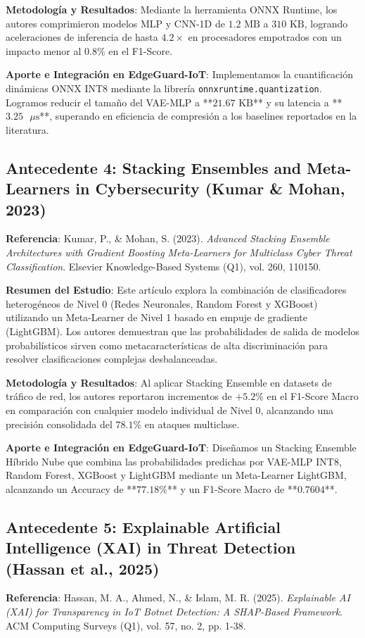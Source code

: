 \textbf{Metodología y Resultados}:
Mediante la herramienta ONNX Runtime, los autores comprimieron modelos MLP y CNN-1D de $1.2\text{ MB}$ a $310\text{ KB}$, logrando aceleraciones de inferencia de hasta $4.2\times$ en procesadores empotrados con un impacto menor al $0.8\%$ en el F1-Score.

\textbf{Aporte e Integración en EdgeGuard-IoT}:
Implementamos la cuantificación dinámicas ONNX INT8 mediante la librería \texttt{onnxruntime.quantization}. Logramos reducir el tamaño del VAE-MLP a **$21.67\text{ KB}$** y su latencia a **$3.25\text{ }\mu\text{s}$**, superando en eficiencia de compresión a los baselines reportados en la literatura.

\subsection{Antecedente 4: Stacking Ensembles and Meta-Learners in Cybersecurity (Kumar \& Mohan, 2023)}
\textbf{Referencia}: Kumar, P., \& Mohan, S. (2023). \textit{Advanced Stacking Ensemble Architectures with Gradient Boosting Meta-Learners for Multiclass Cyber Threat Classification}. Elsevier Knowledge-Based Systems (Q1), vol. 260, 110150.

\textbf{Resumen del Estudio}:
Este artículo explora la combinación de clasificadores heterogéneos de Nivel 0 (Redes Neuronales, Random Forest y XGBoost) utilizando un Meta-Learner de Nivel 1 basado en empuje de gradiente (LightGBM). Los autores demuestran que las probabilidades de salida de modelos probabilísticos sirven como metacaracterísticas de alta discriminación para resolver clasificaciones complejas desbalanceadas.

\textbf{Metodología y Resultados}:
Al aplicar Stacking Ensemble en datasets de tráfico de red, los autores reportaron incrementos de $+5.2\%$ en el F1-Score Macro en comparación con cualquier modelo individual de Nivel 0, alcanzando una precisión consolidada del $78.1\%$ en ataques multiclase.

\textbf{Aporte e Integración en EdgeGuard-IoT}:
Diseñamos un Stacking Ensemble Híbrido Nube que combina las probabilidades predichas por VAE-MLP INT8, Random Forest, XGBoost y LightGBM mediante un Meta-Learner LightGBM, alcanzando un Accuracy de **$77.18\%$** y un F1-Score Macro de **$0.7604$**.

\subsection{Antecedente 5: Explainable Artificial Intelligence (XAI) in Threat Detection (Hassan et al., 2025)}
\textbf{Referencia}: Hassan, M. A., Ahmed, N., \& Islam, M. R. (2025). \textit{Explainable AI (XAI) for Transparency in IoT Botnet Detection: A SHAP-Based Framework}. ACM Computing Surveys (Q1), vol. 57, no. 2, pp. 1-38.

